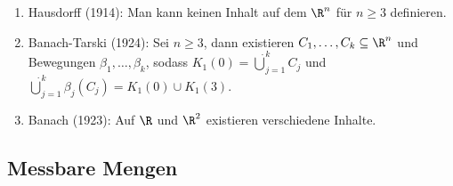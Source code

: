 \begin{bem}
\label{bem:3.3}
\begin{enumerate}[label=\arabic{*}.)]
  \item Hausdorff (1914): Man kann keinen Inhalt auf dem $\R^n$ für $n\ge3$
  definieren.
  \item Banach-Tarski (1924): Sei $n\ge 3$, dann existieren
  $C_1,\ldots,C_k\subseteq\R^n$ und Bewegungen $\beta_1,\ldots,\beta_k$, sodass
  $K_1(0) = \dot{\bigcup}_{j=1}^k C_j$ und
  $\dot{\bigcup}_{j=1}^k \beta_j(C_j) = K_1(0) \cup K_1(3)$.
  \item Banach (1923): Auf $\R$ und $\R^2$ existieren verschiedene
  Inhalte.\maphere
\end{enumerate}
\end{bem}

\subsection{Messbare Mengen}

